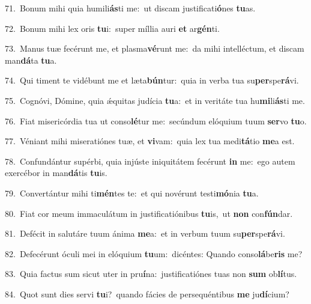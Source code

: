 {\numbfont\textcolor{\numbcolor}{71.}}~Bonum mihi quia humili\-\textbf{ás}\-ti me:~\star ut discam justificati\-\textbf{ó}\-nes \textbf{tu}\-as.\par
{\numbfont\textcolor{\numbcolor}{72.}}~Bonum mihi lex oris \textbf{tu}\-i:~\star super míllia auri \textbf{et} ar\-\textbf{gén}\-ti.\par
{\numbfont\textcolor{\numbcolor}{73.}}~Manus tuæ fecérunt me, et plasma\-\textbf{vé}\-runt me:~\star da mihi intelléctum, et discam man\-\textbf{dá}\-ta \textbf{tu}\-a.\par
{\numbfont\textcolor{\numbcolor}{74.}}~Qui timent te vidébunt me et læta\-\textbf{bún}\-tur:~\star quia in verba tua su\-\textbf{per}\-spe\-\textbf{rá}\-vi.\par
{\numbfont\textcolor{\numbcolor}{75.}}~Cognóvi, Dómine, quia ǽquitas judícia \textbf{tu}\-a:~\star et in veritáte tua hu\-\textbf{mi}\-li\-\textbf{ás}\-ti me.\par
{\numbfont\textcolor{\numbcolor}{76.}}~Fiat misericórdia tua ut conso\-\textbf{lé}\-tur me:~\star secúndum elóquium tuum \textbf{ser}\-vo \textbf{tu}\-o.\par
{\numbfont\textcolor{\numbcolor}{77.}}~Véniant mihi miseratiónes tuæ, et \textbf{vi}\-vam:~\star quia lex tua medi\-\textbf{tá}\-tio \textbf{me}\-a est.\par
{\numbfont\textcolor{\numbcolor}{78.}}~Confundántur supérbi, quia injúste iniquitátem fecérunt \textbf{in} me:~\star ego autem exercébor in man\-\textbf{dá}\-tis \textbf{tu}\-is.\par
{\numbfont\textcolor{\numbcolor}{79.}}~Convertántur mihi ti\-\textbf{mén}\-tes te:~\star et qui novérunt testi\-\textbf{mó}\-nia \textbf{tu}\-a.\par
{\numbfont\textcolor{\numbcolor}{80.}}~Fiat cor meum immaculátum in justificatiónibus \textbf{tu}\-is,~\star ut \textbf{non} con\-\textbf{fún}\-dar.\par
{\numbfont\textcolor{\numbcolor}{81.}}~Defécit in salutáre tuum ánima \textbf{me}\-a:~\star et in verbum tuum su\-\textbf{per}\-spe\-\textbf{rá}\-vi.\par
{\numbfont\textcolor{\numbcolor}{82.}}~Defecérunt óculi mei in elóquium \textbf{tu}\-um:~\star dicéntes: Quando conso\-\textbf{lá}\-be\textbf{ris} me?\par
{\numbfont\textcolor{\numbcolor}{83.}}~Quia factus sum sicut uter in pru\-\textbf{í}\-na:~\star justificatiónes tuas non \textbf{sum} ob\-\textbf{lí}\-tus.\par
{\numbfont\textcolor{\numbcolor}{84.}}~Quot sunt dies servi \textbf{tu}\-i?~\star quando fácies de persequéntibus \textbf{me} ju\-\textbf{dí}\-cium?\par
